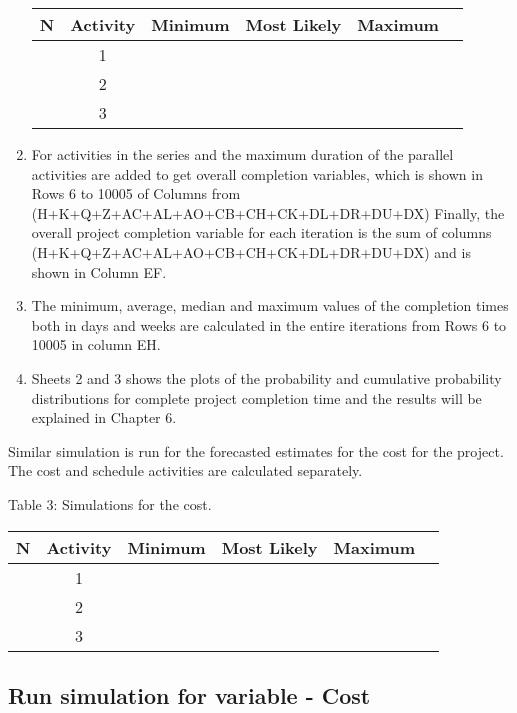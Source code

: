 \begin{enumerate}
\begin{center}
\begin{tabular}{ |c|c|c|c|c| c|}
		\hline
		N&Activity & Minimum & Most Likely & Maximum\\
		\hline
		&1 & &  & \\ 
		\hline
		&2 & & &\\ 
		\hline
		&3& & &\\ 
		\hline
	\end{tabular}\label{table2}	
\end{center}

\item For activities in the series and the maximum duration of the parallel activities are added to get overall completion variables, which is shown in Rows 6 to 10005 of Columns from (H+K+Q+Z+AC+AL+AO+CB+CH+CK+DL+DR+DU+DX)
Finally, the overall project completion variable for each iteration is the sum of columns (H+K+Q+Z+AC+AL+AO+CB+CH+CK+DL+DR+DU+DX) and is shown in Column EF.

\item The minimum, average, median and maximum values of the completion times both in days and weeks are calculated in the entire iterations from Rows 6 to 10005 in column EH.

\item Sheets 2 and 3 shows the plots of the probability and cumulative probability distributions for complete project completion time and the results will be explained in Chapter 6.

\end{enumerate}

Similar simulation is run for the forecasted estimates for the cost for the project. The cost and schedule activities are calculated separately.

Table 3: Simulations for the cost.

\begin{center}
	\begin{tabular}{ |c|c|c|c|c| c|} 
		\hline
		N&Activity & Minimum & Most Likely & Maximum\\
		\hline
		&1 & &  & \\ 
		\hline
		&2 & & &\\ 
		\hline
		&3& & &\\ 
		\hline
	\end{tabular}\label{table3}	
\end{center}

\subsection{Run simulation for variable - Cost}

